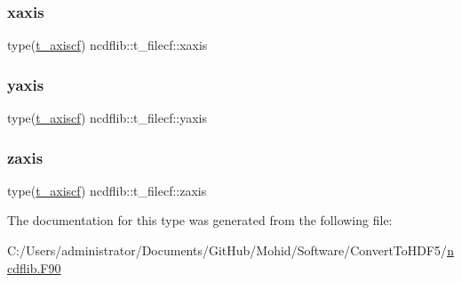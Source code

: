 \mbox{\label{structncdflib_1_1t__filecf_a836914f9ad3e9198889813129bffe662}} 
\subsubsection{\texorpdfstring{xaxis}{xaxis}}
{\footnotesize\ttfamily type(\mbox{\hyperlink{structncdflib_1_1t__axiscf}{t\+\_\+axiscf}}) ncdflib\+::t\+\_\+filecf\+::xaxis\hspace{0.3cm}{\ttfamily [private]}}

\mbox{\label{structncdflib_1_1t__filecf_ab0708f25ee5b04fe1d14a0aae71ad815}} 
\subsubsection{\texorpdfstring{yaxis}{yaxis}}
{\footnotesize\ttfamily type(\mbox{\hyperlink{structncdflib_1_1t__axiscf}{t\+\_\+axiscf}}) ncdflib\+::t\+\_\+filecf\+::yaxis\hspace{0.3cm}{\ttfamily [private]}}

\mbox{\label{structncdflib_1_1t__filecf_a2f57171048a67946d2eb207750c27780}} 
\subsubsection{\texorpdfstring{zaxis}{zaxis}}
{\footnotesize\ttfamily type(\mbox{\hyperlink{structncdflib_1_1t__axiscf}{t\+\_\+axiscf}}) ncdflib\+::t\+\_\+filecf\+::zaxis\hspace{0.3cm}{\ttfamily [private]}}



The documentation for this type was generated from the following file\+:\begin{DoxyCompactItemize}
\item 
C\+:/\+Users/administrator/\+Documents/\+Git\+Hub/\+Mohid/\+Software/\+Convert\+To\+H\+D\+F5/\mbox{\hyperlink{ncdflib_8_f90}{ncdflib.\+F90}}\end{DoxyCompactItemize}
